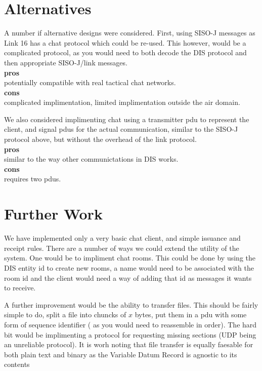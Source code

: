 \documentclass[12pt]{article}
\begin{document}
\section{Alternatives}
\label{sec:alternatives}

A number if alternative designs were considered.  First, using SISO-J
messages as Link 16 has a chat protocol which could be re-used. This
however, would be a complicated protocol, as you would need to both
decode the DIS protocol and then appropriate SISO-J/link messages.
%
\\
\textbf{pros} \\
potentially compatible with real tactical chat networks.
%
\\
\textbf{cons} \\
complicated implimentation, limited implimentation outside the air
domain.

We also considered implimenting chat using a transmitter pdu
to represent the client, and signal pdus for the actual communication,
similar to the SISO-J protocol above, but without the overhead of the link
protocol.
%
\\
\textbf{pros} \\
similar to the way other communictations in DIS works.
%
\\
\textbf{cons} \\
requires two pdus.

\section{Further Work}
\label{sec:further-work}
We have implemented only a very basic chat client, and simple issuance
and receipt rules. There are a number of ways we could extend the
utility of the system. One would be to impliment chat rooms. This
could be done by using the DIS entity id to create new rooms, a name
would need to be associated with the room id and the client would need
a way of adding that id as messages it wants to receive.

A further improvement would be the ability to transfer files. This
should be fairly simple to do, split a file into chuncks of $x$ bytes,
put them in a pdu with some form of sequence identifier ( as you would
need to reassemble in order). The hard bit would be implimenting a
protocol for requesting missing sections (UDP being an unreliable
protocol). It is worh noting that file transfer is equally faesable
for both plain text and binary as the Variable Datum Record is
agnostic to its contents
\end{document}

